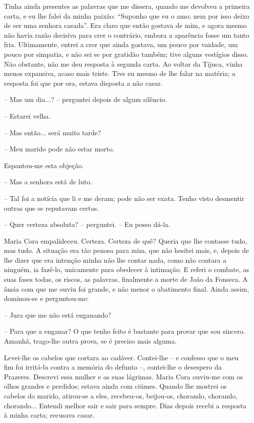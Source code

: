 Tinha ainda presentes as palavras que me dissera, quando me devolveu a
primeira carta, e eu lhe falei da minha paixão: ``Suponho que eu o amo;
nem por isso deixo de ser uma senhora casada''. Era claro que então
gostava de mim, e agora mesmo não havia razão decisiva para crer o
contrário, embora a aparência fosse um tanto fria. Ultimamente, entrei a
crer que ainda gostava, um pouco por vaidade, um pouco por simpatia, e
não sei se por gratidão também; tive alguns vestígios disso. Não
obstante, não me deu resposta à segunda carta. Ao voltar da Tijuca,
vinha menos expansiva, acaso mais triste. Tive eu mesmo de lhe falar na
matéria; a resposta foi que por ora, estava disposta a não casar.

-- Mas um dia...? -- perguntei depois de algum silêncio.

-- Estarei velha.

-- Mas então... será muito tarde?

-- Meu marido pode não estar morto.

Espantou-me esta objeção.

-- Mas a senhora está de luto.

-- Tal foi a notícia que li e me deram; pode não ser exata. Tenho visto
desmentir outras que se reputavam certas.

-- Quer certeza absoluta? -- perguntei. -- Eu posso dá-la.

Maria Cora empalideceu. Certeza. Certeza de quê? Queria que lhe contasse
tudo, mas tudo. A situação era tão penosa para mim, que não hesitei
mais, e, depois de lhe dizer que era intenção minha não lhe contar nada,
como não contara a ninguém, ia fazê-lo, unicamente para obedecer à
intimação. E referi o combate, as suas fases todas, os riscos, as
palavras, finalmente a morte de João da Fonseca. A ânsia com que me
ouviu foi grande, e não menor o abatimento final. Ainda assim,
dominou-se e perguntou-me:

-- Jura que me não está enganando?

-- Para que a enganar? O que tenho feito é bastante para provar que sou
sincero. Amanhã, trago-lhe outra prova, se é preciso mais alguma.

Levei-lhe os cabelos que cortara ao cadáver. Contei-lhe -- e confesso
que o meu fim foi irritá-la contra a memória do defunto --, contei-lhe o
desespero da Prazeres. Descrevi essa mulher e as suas lágrimas. Maria
Cora ouviu-me com os olhos grandes e perdidos; estava ainda com ciúmes.
Quando lhe mostrei os cabelos do marido, atirou-se a eles, recebeu-os,
beijou-os, chorando, chorando, chorando... Entendi melhor sair e sair
para sempre. Dias depois recebi a resposta à minha carta; recusava
casar.

